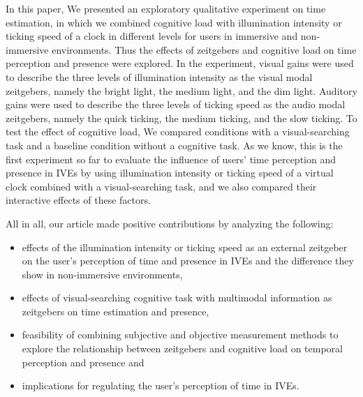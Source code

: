 \documentclass[sigconf]{acmart}
\begin{document}
In this paper, We presented an exploratory qualitative experiment on time estimation, in which we combined cognitive load with illumination intensity or ticking speed of a clock in different levels for users in immersive and non-immersive environments. Thus the effects of zeitgebers and cognitive load on time perception and presence were explored. In the experiment, visual gains were used to describe the three levels of illumination intensity as the visual modal zeitgebers, namely the bright light, the medium light, and the dim light. Auditory gains were used to describe the three levels of ticking speed as the audio modal zeitgebers, namely the quick ticking, the medium ticking, and the slow ticking. To test the effect of cognitive load, We compared conditions with a visual-searching task and a baseline condition without a cognitive task. As we know, this is the first experiment so far to evaluate the influence of users' time perception and presence in IVEs by using illumination intensity or ticking speed of a virtual clock combined with a visual-searching task, and we also compared their interactive effects of these factors.




All in all, our article made positive contributions by analyzing the following:
\begin{itemize}
\item effects of the illumination intensity or ticking speed as an external zeitgeber on the user's perception of time and presence in IVEs and the difference they show in non-immersive environments,
\item effects of visual-searching cognitive task with multimodal information as zeitgebers on time estimation and presence,
\item feasibility of combining subjective and objective measurement methods to explore the relationship between zeitgebers and cognitive load on temporal perception and presence and
\item implications for regulating the user's perception of time in IVEs.
\end{itemize}
\end{document}
